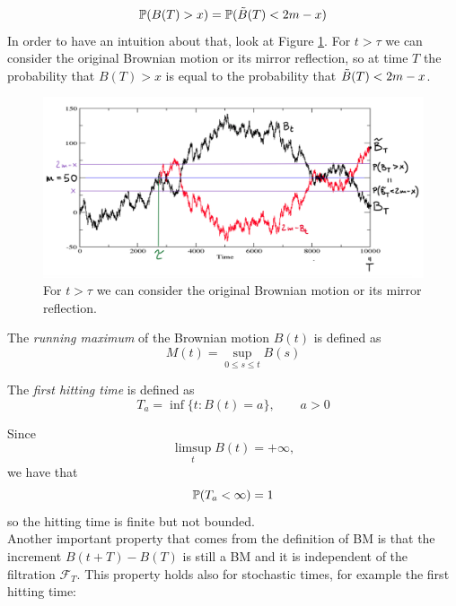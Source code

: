 \begin{equation}
    \mathbb{P}(B(T)>x) = \mathbb{P}(\Tilde{B}(T)<2m-x)
\end{equation}
In order to have an intuition about that, look at Figure \ref{fig:bmmirror}. For $t>\tau$ we can consider the original Brownian motion or its mirror reflection, so at time $T$ the probability that $B(T)>x$ is equal to the probability that $\Tilde{B}(T)<2m-x$.
\begin{figure}[h]
    \centering
    \includegraphics[scale=0.22]{fig/tmp/fig34.png}
    \caption{For $t>\tau$ we can consider the original Brownian motion or its mirror reflection.}
    \label{fig:bmmirror}
\end{figure}
\begin{definition}
    The \emph{running maximum} of the Brownian motion $B(t)$ is defined as
    \begin{equation}
        M(t) = \sup_{0\le s\le t} B(s)
    \end{equation}
\end{definition}
\begin{definition}
    The \emph{first hitting time} is defined as
    \begin{equation}
        T_a = \inf\{t:B(t)=a\}, \qquad a>0
    \end{equation}
\end{definition}
Since
\begin{equation*}
    \limsup_t B(t) = +\infty,
\end{equation*}
we have that
\begin{equation}
    \mathbb{P}(T_a<\infty) = 1
\end{equation}
so the hitting time is finite but not bounded. \\
Another important property that comes from the definition of BM is that the increment $B(t+T)-B(T)$ is still a BM and it is independent of the filtration $\mathcal{F}_T$. This property holds also for stochastic times, for example the first hitting time:

